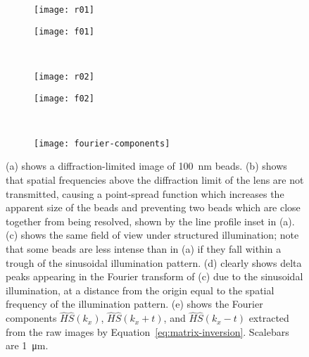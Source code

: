 \begin{figure}[p]
\centering
\begin{subfigure}[b]{0.45\textwidth}
	\texttt{[image: r01]}
	\caption{}\label{fig:beads-widefield}
\end{subfigure}
\raisebox{9.3em}{\noindent\Huge$\Leftrightarrow$}
\begin{subfigure}[b]{0.45\textwidth}
	\texttt{[image: f01]}
	\caption{}\label{fig:fourier-widefield}
\end{subfigure}
~\newline
\begin{subfigure}[b]{0.45\textwidth}
	\texttt{[image: r02]}
	\caption{}\label{fig:beads-raw-SIM}
\end{subfigure}
\raisebox{9.3em}{\noindent\Huge$\Leftrightarrow$}
\begin{subfigure}[b]{0.45\textwidth}
	\texttt{[image: f02]}
	\caption{}\label{fig:fourier-raw-SIM}
\end{subfigure}
~\newline
\begin{subfigure}[b]{0.45\textwidth}
	\texttt{[image: fourier-components]}
	\caption{}\label{fig:fourier-components}
\end{subfigure}
\caption[LAG SIM: A sinusoidal illumination pattern is visible as delta peaks in Fourier space]{(a) shows a diffraction-limited image of \SI{100}{\nano\metre} beads.
(b) shows that spatial frequencies above the diffraction limit of the lens are not transmitted, causing a point-spread function which increases the apparent size of the beads and preventing two beads which are close together from being resolved, shown by the line profile inset in (a).
(c) shows the same field of view under structured illumination; note that some beads are less intense than in (a) if they fall within a trough of the sinusoidal illumination pattern.
(d) clearly shows delta peaks appearing in the Fourier transform of (c) due to the sinusoidal illumination, at a distance from the origin equal to the spatial frequency of the illumination pattern.
(e) shows the Fourier components $\hat{H}\hat{S}\left(k_x\right)$, $\hat{H}\hat{S}\left(k_x+t\right)$, and $\hat{H}\hat{S}\left(k_x-t\right)$ extracted from the raw images by Equation~\ref{eq:matrix-inversion}. Scalebars are \SI{1}{\micro\metre}.
}
\label{fig:fourier-reconstruction}
\end{figure}

